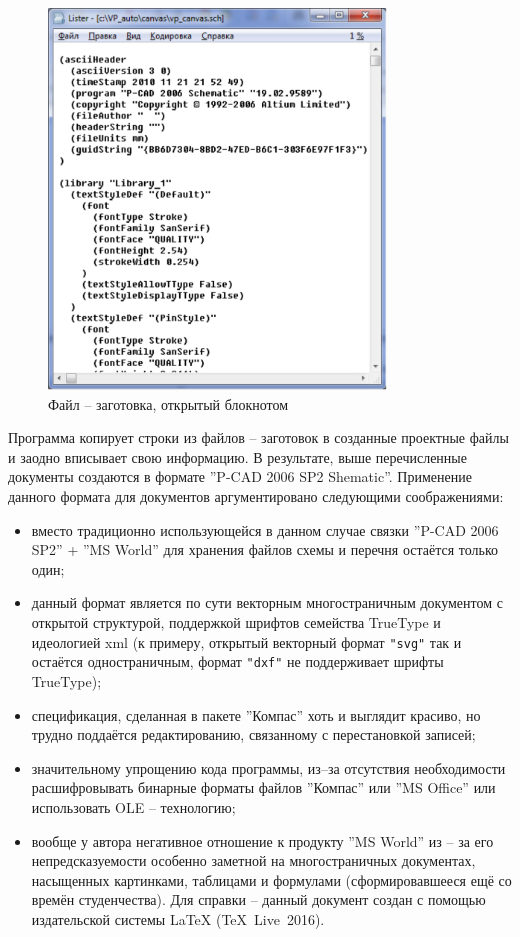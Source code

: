 \begin{figure}[H]\center
  \includegraphics[width=0.8\textwidth]{VP_auto/pictures/pic_vp_canvas_file}
  \caption{Файл -- заготовка, открытый блокнотом} \label{p:pic_vp_canvas_file}
\end{figure}

Программа копирует строки из файлов -- заготовок в созданные проектные файлы и заодно вписывает свою информацию. В результате, выше перечисленные документы создаются в формате ''P-CAD 2006 SP2 Shematic''. Применение данного формата для документов аргументировано следующими соображениями:
\begin{itemize}
  \item вместо традиционно использующейся в данном случае связки ''P-CAD 2006 SP2'' + ''MS World'' для хранения файлов схемы и перечня остаётся только один;
  \item данный формат является по сути векторным многостраничным документом с открытой структурой, поддержкой шрифтов семейства TrueType и идеологией xml (к примеру, открытый векторный формат \verb|"svg"| так и остаётся одностраничным, формат \verb|"dxf"| не поддерживает шрифты TrueType);   
  \item спецификация, сделанная в пакете ''Компас'' хоть и выглядит красиво, но трудно поддаётся редактированию, связанному с перестановкой записей;
  \item значительному упрощению кода программы, из--за отсутствия необходимости расшифровывать бинарные форматы файлов ''Компас'' или ''MS Office'' или использовать OLE -- технологию;
  \item вообще у автора негативное отношение к продукту ''MS World''  из -- за его непредсказуемости особенно заметной на многостраничных документах, насыщенных картинками, таблицами и формулами (сформировавшееся ещё со времён студенчества). Для справки -- данный документ создан с помощью издательской системы LaTeX (TeX~Live~2016).
\end{itemize}

